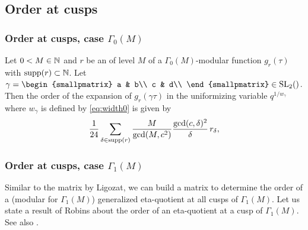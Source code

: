 \documentclass{article}
\begin{document}
\begin{AdditionalInformation}
\subsection{Order at cusps}

\subsubsection{Order at cusps, case $\Gamma_0(M)$}

\begin{Lemma}
  \cite[Proposition~3.2.8]{Ligozat_CourbesModulaires_1975}
  \label{thm:eta-order-0}
  Let $0<M\in\mathbb{N}$ and $r$ be an  of level
  $M$ of a $\Gamma_0(M)$-modular function $g_r(\tau)$ with
  $\operatorname{supp}(r)\subset\mathbb{N}$.
  Let
  $\gamma = \begin{smallpmatrix} a & b\\ c & d\\ \end{smallpmatrix}
  \in \SL2Z$.
  Then the order of the expansion of $g_r(\gamma\tau)$ in the
  uniformizing variable $q^{1/w_\gamma}$ where $w_\gamma$ is defined by
  \eqref{eq:width0} is given by
  \begin{gather}
    \frac{1}{24}\sum_{\delta\in\operatorname{supp}(r)} \frac{M}{\gcd(M, c^2)}
                       \frac{\gcd(c,\delta)^2}{\delta} \, r_\delta,
    \label{eq:order-gamma0}
  \end{gather}
\end{Lemma}


\subsubsection{Order at cusps, case $\Gamma_1(M)$}

Similar to the matrix by Ligozat, we can build a matrix to determine
the order of a (modular for $\Gamma_1(M)$) generalized eta-quotient
at all cusps of $\Gamma_1(M)$.
%
Let us state a result of Robins about the order of an eta-quotient at
a cusp of $\Gamma_1(M)$. See also
\cite[Lemma~2.6]{ChenDuZhao_FindingModularFunctionsRamanujan_2019}.


\end{AdditionalInformation}
\end{document}
